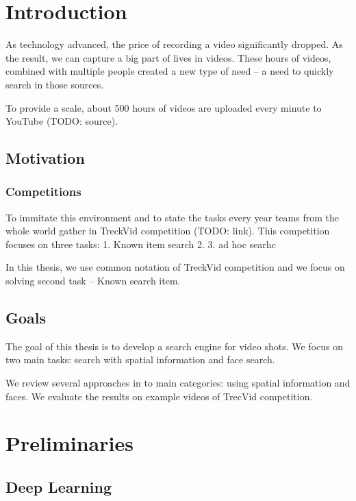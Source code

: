\chapter{Introduction}
As technology advanced, the price of recording a video significantly dropped. As the result, we can capture a big part of lives in videos. These hours of videos, combined with multiple people created a new type of need -- a need to quickly search in those sources.

To provide a scale, about 500 hours of videos are uploaded every minute to YouTube (TODO: source).

\section{Motivation}

\subsection{Competitions}

To immitate this environment and to state the tasks every year teams from the whole world gather in TreckVid competition (TODO: link). This competition focuses on three tasks:
1. Known item search
2. 
3. ad hoc searhc

In this thesis, we use common notation of TreckVid competition and we focus on solving second task -- Known search item. 


\section{Goals}
The goal of this thesis is to develop a search engine for video shots. We focus on two main tasks: search with spatial information and face search. 

We review several approaches in to main categories: using spatial information and faces. We evaluate the results on example videos of TrecVid competition.



\chapter{Preliminaries}

\section{Deep Learning}

